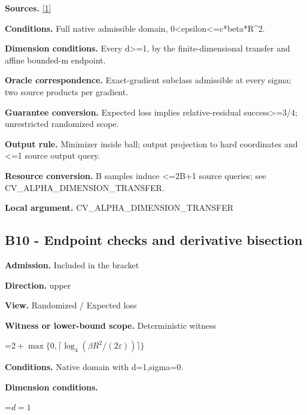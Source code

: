 \documentclass[10pt,a4paper]{article}
\newcommand{\AtlasMath}[1]{\par\begingroup\centering\setbox0=\hbox{$\displaystyle #1$}\ifdim\wd0>1.4\linewidth\typeout{ATLAS WIDE FORMULA: \the\wd0}\fi\ifdim\wd0>\linewidth\resizebox{\linewidth}{!}{\box0}\else\box0\fi\par\endgroup}
\begin{document}
\textbf{Sources.} \href{https://arxiv.org/pdf/2609.10874}{[1]}



\textbf{Conditions.} Full native admissible domain, 0<epsilon<=c*beta*R\textasciicircum{}2.



\textbf{Dimension conditions.} Every d>=1, by the finite-dimensional transfer and affine bounded-m endpoint.



\textbf{Oracle correspondence.} Exact-gradient subclass admissible at every sigma; two source products per gradient.



\textbf{Guarantee conversion.} Expected loss implies relative-residual success>=3/4; unrestricted randomized scope.



\textbf{Output rule.} Minimizer inside ball; output projection to hard coordinates and <=1 source output query.



\textbf{Resource conversion.} B samples induce <=2B+1 source queries; see CV\_ALPHA\_DIMENSION\_TRANSFER.



\textbf{Local argument.} CV\_ALPHA\_DIMENSION\_TRANSFER



\subsection{B10 - Endpoint checks and derivative bisection}


\textbf{Admission.} Included in the bracket



\textbf{Direction.} upper



\textbf{View.} Randomized / Expected loss



\textbf{Witness or lower-bound scope.} Deterministic witness



\AtlasMath{2+\max\{0,\lceil\log_4(\beta R^2/(2\varepsilon))\rceil\}}


\textbf{Conditions.} Native domain with d=1,sigma=0.



\textbf{Dimension conditions.}



\AtlasMath{d=1}
\end{document}
